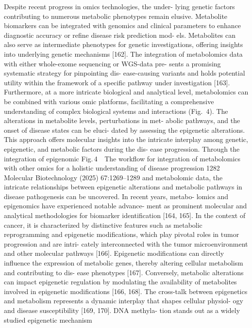 Despite recent progress in omics technologies, the under-
lying genetic factors contributing to numerous metabolic
phenotypes remain elusive. Metabolite biomarkers can be
integrated with genomics and clinical parameters to enhance
diagnostic accuracy or refine disease risk prediction mod-
els. Metabolites can also serve as intermediate phenotypes
for genetic investigations, offering insights into underlying
genetic mechanisms [162]. The integration of metabolomics
data with either whole-exome sequencing or WGS-data pre-
sents a promising systematic strategy for pinpointing dis-
ease-causing variants and holds potential utility within the
framework of a specific pathway under investigation [163].
Furthermore, at a more intricate biological and analytical
level, metabolomics can be combined with various omic
platforms, facilitating a comprehensive understanding of
complex biological systems and interactions (Fig. 4).
The alterations in metabolite levels, perturbations in met-
abolic pathways, and the onset of disease states can be eluci-
dated by assessing the epigenetic alterations. This approach
offers molecular insights into the intricate interplay among
genetic, epigenetic, and metabolic factors during the dis-
ease progression. Through the integration of epigenomic
Fig. 4   The workflow for integration of metabolomics with other omics for a holistic understanding of disease progression
1282
Molecular Biotechnology (2025) 67:1269–1289
and metabolomic data, the intricate relationships between
epigenetic alterations and metabolic pathways in disease
pathogenesis can be uncovered. In recent years, metabo-
lomics and epigenomics have experienced notable advance-
ment as prominent molecular and analytical methodologies
for biomarker identification [164, 165]. In the context of
cancer, it is characterized by distinctive features such as
metabolic reprogramming and epigenetic modifications,
which play pivotal roles in tumor progression and are intri-
cately interconnected with the tumor microenvironment and
other molecular pathways [166]. Epigenetic modifications
can directly influence the expression of metabolic genes,
thereby altering cellular metabolism and contributing to dis-
ease phenotypes [167]. Conversely, metabolic alterations can
impact epigenetic regulation by modulating the availability
of metabolites involved in epigenetic modifications [166,
168]. The cross-talk between epigenetics and metabolism
represents a dynamic interplay that shapes cellular physiol-
ogy and disease susceptibility [169, 170]. DNA methyla-
tion stands out as a widely studied epigenetic mechanism
